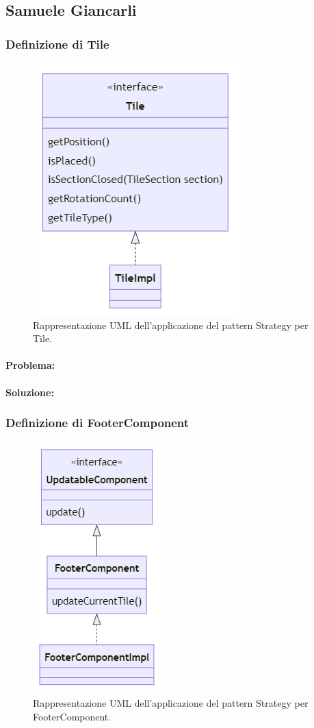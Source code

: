\subsection*{Samuele Giancarli}
\subsubsection*{Definizione di Tile}
\begin{figure}[ht]
    \centering\includegraphics[]{images/tile_uml.png}
    \caption{Rappresentazione UML dell'applicazione del pattern Strategy per Tile.} %
\end{figure}
\paragraph{Problema:}
\paragraph{Soluzione:}

\subsubsection*{Definizione di FooterComponent}
\begin{figure}[ht]
    \centering\includegraphics[]{images/FooterComponent_uml.png}
    \caption{Rappresentazione UML dell'applicazione del pattern Strategy per FooterComponent.}
\end{figure}
